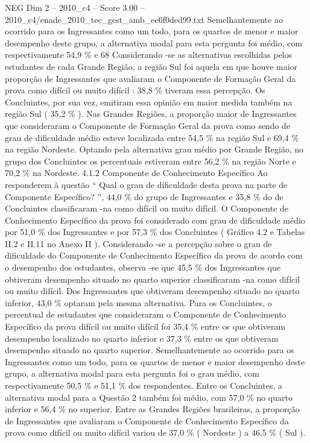 \begin{textsample}{NEG Dim 2 – 2010\_c4 – Score 3.00 – 2010\_c4/enade\_2010\_tec\_gest\_amb\_ee6f0ded99.txt}
Semelhantemente ao ocorrido para os Ingressantes como um todo, para os quartos de menor e maior desempenho deste grupo, a alternativa modal para esta pergunta foi médio, com respectivamente 54,9 \% e 68 Considerando -se as alternativas escolhidas pelos estudantes de cada Grande Região, a região Sul foi aquela em que houve maior proporção de Ingressantes que avaliaram o Componente de Formação Geral da prova como difícil ou muito difícil : 38,8 \% tiveram essa percepção.
Os Concluintes, por sua vez, emitiram essa opinião em maior medida também na região Sul ( 35,2 \% ).
Nas Grandes Regiões, a proporção maior de Ingressantes que consideraram o Componente de Formação Geral da prova como sendo de grau de dificuldade médio esteve localizada entre 54,5 \% na região Sul e 69,4 \% na região Nordeste.
Optando pela alternativa grau médio por Grande Região, no grupo dos Concluintes os percentuais estiveram entre 56,2 \% na região Norte e 70,2 \% na Nordeste. 4.1.2 Componente de Conhecimento Específico Ao responderem à questão “ Qual o grau de dificuldade desta prova na parte de Componente Específico? ”, 44,0 \% do grupo de Ingressantes e 35,8 \% do de Concluintes classificaram -na como difícil ou muito difícil.
O Componente de Conhecimento Específico da prova foi considerado com grau de dificuldade médio por 51,0 \% dos Ingressantes e por 57,3 \% dos Concluintes ( Gráfico 4.2 e Tabelas II.2 e II.11 no Anexo II ).
Considerando -se a percepção sobre o grau de dificuldade do Componente de Conhecimento Específico da prova de acordo com o desempenho dos estudantes, observa -se que 45,5 \% dos Ingressantes que obtiveram desempenho situado no quarto superior classificaram -na como difícil ou muito difícil.
Dos Ingressantes que obtiveram desempenho situado no quarto inferior, 43,0 \% optaram pela mesma alternativa.
Para os Concluintes, o percentual de estudantes que consideraram o Componente de Conhecimento Específico da prova difícil ou muito difícil foi 35,4 \% entre os que obtiveram desempenho localizado no quarto inferior e 37,3 \% entre os que obtiveram desempenho situado no quarto superior.
Semelhantemente ao ocorrido para os Ingressantes como um todo, para os quartos de menor e maior desempenho deste grupo, a alternativa modal para esta pergunta foi o grau médio, com respectivamente 50,5 \% e 51,1 \% dos respondentes.
Entre os Concluintes, a alternativa modal para a Questão 2 também foi médio, com 57,0 \% no quarto inferior e 56,4 \% no superior.
Entre as Grandes Regiões brasileiras, a proporção de Ingressantes que avaliaram o Componente de Conhecimento Específico da prova como difícil ou muito difícil variou de 37,0 \% ( Nordeste ) a 46,5 \% ( Sul ).

\end{textsample}
